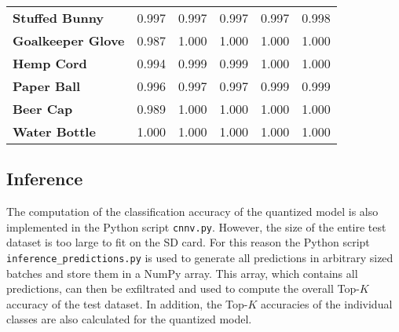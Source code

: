 \begin{table}
\begin{tabular}{llllll}
    \textbf{Stuffed Bunny} & \num{0.997} & \num{0.997} & \num{0.997} & \num{0.997} & \num{0.998} \\
    \textbf{Goalkeeper Glove} & \num{0.987} & \num{1.000} & \num{1.000} & \num{1.000} & \num{1.000} \\
    \textbf{Hemp Cord} & \num{0.994} & \num{0.999} & \num{0.999} & \num{1.000} & \num{1.000} \\
    \textbf{Paper Ball} & \num{0.996} & \num{0.997} & \num{0.997} & \num{0.999} & \num{0.999} \\
    \textbf{Beer Cap} & \num{0.989} & \num{1.000} & \num{1.000} & \num{1.000} & \num{1.000} \\
    \textbf{Water Bottle} & \num{1.000} & \num{1.000} & \num{1.000} & \num{1.000} & \num{1.000} \\
    \bottomrule
  \end{tabular}
\end{table}

\subsection{Inference}
\label{subsec:verification_and_benchmark:classification_performance:inference}

The computation of the classification accuracy of the quantized model is also implemented in the Python script \texttt{cnnv.py}.
However, the size of the entire test dataset is too large to fit on the SD card.
For this reason the Python script \texttt{inference\_predictions.py} is used to generate all predictions in arbitrary sized batches and store them in a NumPy array.
This array, which contains all predictions, can then be exfiltrated and used to compute the overall Top-$K$ accuracy of the test dataset.
In addition, the Top-$K$ accuracies of the individual classes are also calculated for the quantized model.

